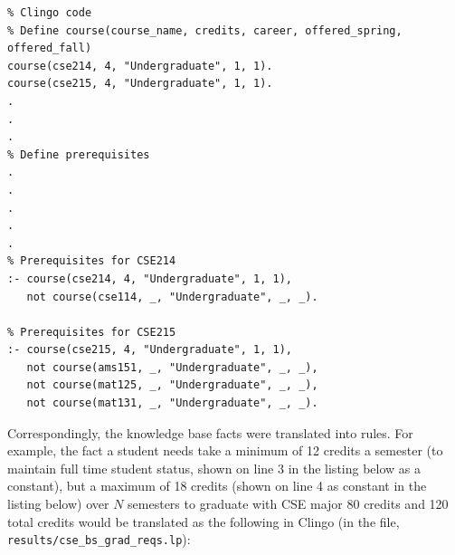 \documentclass[12pt]{article}
\begin{document}
    \begin{lstlisting}
% Clingo code
% Define course(course_name, credits, career, offered_spring, offered_fall)
course(cse214, 4, "Undergraduate", 1, 1).
course(cse215, 4, "Undergraduate", 1, 1).
.
.
.
% Define prerequisites
.
.
.
.
.
% Prerequisites for CSE214
:- course(cse214, 4, "Undergraduate", 1, 1), 
   not course(cse114, _, "Undergraduate", _, _). 

% Prerequisites for CSE215
:- course(cse215, 4, "Undergraduate", 1, 1), 
   not course(ams151, _, "Undergraduate", _, _), 
   not course(mat125, _, "Undergraduate", _, _), 
   not course(mat131, _, "Undergraduate", _, _). 
    \end{lstlisting}

    Correspondingly, the knowledge base facts were translated into rules. For example, the fact a student needs take a minimum of 12 credits a semester (to maintain full time student status, shown on line 3 in the listing below as a constant), but a maximum of 18 credits (shown on line 4 as constant in the listing below) over $N$ semesters to graduate with CSE major 80 credits and 120 total credits would be translated as the following in Clingo (in the file, {\tt{results/cse\_bs\_grad\_reqs.lp}}): \\
\end{document}

